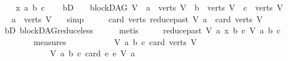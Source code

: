 \begin{isabellebody}
\ \ \isamarkupfalse%
\ x\ a\ b\ c\isanewline
\ \ \isamarkupfalse%
\ bD{\isacharcolon}{\kern0pt}\ {\isachardoublequoteopen}\ {\isasymnot}\ {\isacharparenleft}{\kern0pt}{\isasymnot}\ blockDAG\ V\ {\isasymor}\ a\ {\isasymnotin}\ verts\ V\ {\isasymor}\ b\ {\isasymnotin}\ verts\ V\ {\isasymor}\ c\ {\isasymnotin}\ verts\ V{\isacharparenright}{\kern0pt}{\isachardoublequoteclose}\isanewline
\ \ \isamarkupfalse%
\ \isamarkupfalse%
\ {\isachardoublequoteopen}a\ {\isasymin}\ verts\ V{\isachardoublequoteclose}\ \ \isamarkupfalse%
\ simp\isanewline
\ \ \isamarkupfalse%
\ \isamarkupfalse%
\ {\isachardoublequoteopen}card\ {\isacharparenleft}{\kern0pt}verts\ {\isacharparenleft}{\kern0pt}reduce{\isacharunderscore}{\kern0pt}past\ V\ a{\isacharparenright}{\kern0pt}{\isacharparenright}{\kern0pt}\ {\isacharless}{\kern0pt}\ card\ {\isacharparenleft}{\kern0pt}verts\ V{\isacharparenright}{\kern0pt}{\isachardoublequoteclose}\ \ \ \isanewline
\ \ \ \ \isamarkupfalse%
\ bD\ blockDAG{\isachardot}{\kern0pt}reduce{\isacharunderscore}{\kern0pt}less\isanewline
\ \ \ \ \isamarkupfalse%
\ metis\isanewline
\ \ \isamarkupfalse%
\ \isamarkupfalse%
\ {\isachardoublequoteopen}{\isacharparenleft}{\kern0pt}{\isacharparenleft}{\kern0pt}reduce{\isacharunderscore}{\kern0pt}past\ V\ a{\isacharcomma}{\kern0pt}\ x{\isacharcomma}{\kern0pt}\ b{\isacharcomma}{\kern0pt}\ c{\isacharparenright}{\kern0pt}{\isacharcomma}{\kern0pt}\ V{\isacharcomma}{\kern0pt}\ a{\isacharcomma}{\kern0pt}\ b{\isacharcomma}{\kern0pt}\ c{\isacharparenright}{\kern0pt}\isanewline
\ \ \ \ \ \ \ {\isasymin}\ measures\isanewline
\ \ \ \ \ \ \ \ \ \ \ {\isacharbrackleft}{\kern0pt}{\isasymlambda}{\isacharparenleft}{\kern0pt}V{\isacharcomma}{\kern0pt}\ a{\isacharcomma}{\kern0pt}\ b{\isacharcomma}{\kern0pt}\ c{\isacharparenright}{\kern0pt}{\isachardot}{\kern0pt}\ card\ {\isacharparenleft}{\kern0pt}verts\ V{\isacharparenright}{\kern0pt}{\isacharcomma}{\kern0pt}\ \ \isanewline
\ \ \ \ \ \ \ \ \ \ \ \ {\isasymlambda}{\isacharparenleft}{\kern0pt}V{\isacharcomma}{\kern0pt}\ a{\isacharcomma}{\kern0pt}\ b{\isacharcomma}{\kern0pt}\ c{\isacharparenright}{\kern0pt}{\isachardot}{\kern0pt}\ card\ {\isacharbraceleft}{\kern0pt}e{\isachardot}{\kern0pt}\ e\ {\isasymrightarrow}\isactrlsup {\isacharasterisk}{\kern0pt}\isactrlbsub V\isactrlesub \ a{\isacharbraceright}{\kern0pt}{\isacharbrackright}{\kern0pt}{\isachardoublequoteclose}\ \isanewline
\ \ \ \ \isamarkupfalse%

\end{isabellebody}
